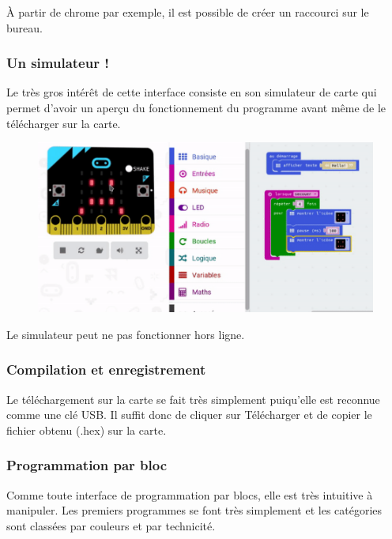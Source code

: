 \begin{remarque}
    À partir de chrome par exemple, il est possible de créer un raccourci sur le bureau.
\end{remarque}



\subsubsection{Un simulateur !}

Le très gros intérêt de cette interface consiste en son simulateur de carte qui permet d’avoir un aperçu du fonctionnement du programme avant même de le télécharger sur la carte.

\begin{figure}[h]
    \centering
    \includegraphics[width=0.75\linewidth]{mb-prog.png}
\end{figure}




\begin{remarque}
    Le simulateur peut ne pas fonctionner hors ligne.
\end{remarque}

\subsubsection{Compilation et enregistrement}

Le téléchargement sur la carte se fait très simplement puiqu’elle est reconnue comme une clé USB. Il suffit donc de cliquer sur Télécharger et de copier le fichier obtenu (.hex) sur la carte.

\subsubsection{Programmation par bloc}

Comme toute interface de programmation par blocs, elle est très intuitive à manipuler. Les premiers programmes se font très simplement et les catégories sont classées par couleurs et par technicité.

